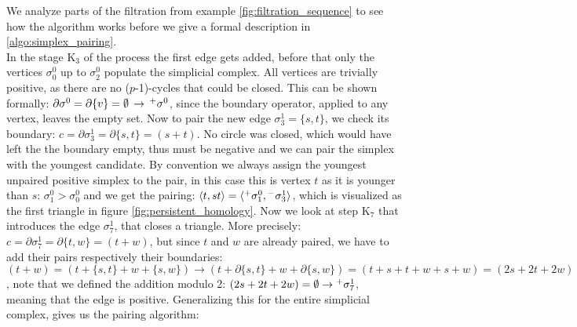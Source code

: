 We analyze parts of the filtration from example \ref{fig:filtration_sequence} to see how the algorithm works before we give a formal description in \ref{algo:simplex_pairing}.\\
In the stage $\mathrm{K}_{3}$ of the process the first edge gets added, before that only the vertices $\sigma^{0}_{0}$ up to $\sigma^{0}_{2}$ populate the simplicial complex. 
All vertices are trivially positive, as there are no ($p$-1)-cycles that could be closed.
This can be shown formally: $\partial \sigma^{0} = \partial \{v\} = \emptyset \,\rightarrow \,\Prefix^{+}{\sigma^{0}}$, since the boundary operator, applied to any vertex, leaves the empty set.
Now to pair the new edge $\sigma^{1}_{3} = \{s,t\}$, we check its boundary: $c = \partial \sigma^{1}_{3} = \partial \{s,t\} = (s+t)$.
No circle was closed, which would have left the the boundary empty, thus must be negative and we can pair the simplex with the youngest candidate.
By convention we always assign the youngest unpaired positive simplex to the pair, in this case this is vertex $t$ as it is younger than $s$: $\sigma^{0}_{1} > \sigma^{0}_{0}$ and we get the pairing: $\langle t, st \rangle = \langle \Prefix^{+}{\sigma^{0}_{1}}, \Prefix^{-}{\sigma^{1}_{3}} \rangle$, which is visualized as the first triangle in figure \ref{fig:persistent_homology}.
Now we look at step $\mathrm{K}_{7}$ that introduces the edge $\sigma^{1}_{7}$, that closes a triangle.
More precisely: $c = \partial \sigma^{1}_{7} = \partial \{t, w\} = (t + w)$, but since $t$ and $w$ are already paired, we have to add their pairs respectively their boundaries: $(t + w) = (t + \{s,t\} + w + \{s,w\}) \rightarrow (t + \partial \{s,t\} + w + \partial \{s,w\}) = (t + s + t + w + s + w) = (2s + 2t +2w)$, note that we defined the addition modulo 2: $(2s + 2t +2w) = \emptyset \rightarrow \Prefix^{+}{\sigma^{1}_{7}}$, meaning that the edge is positive.
Generalizing this for the entire simplicial complex, gives us the pairing algorithm:
